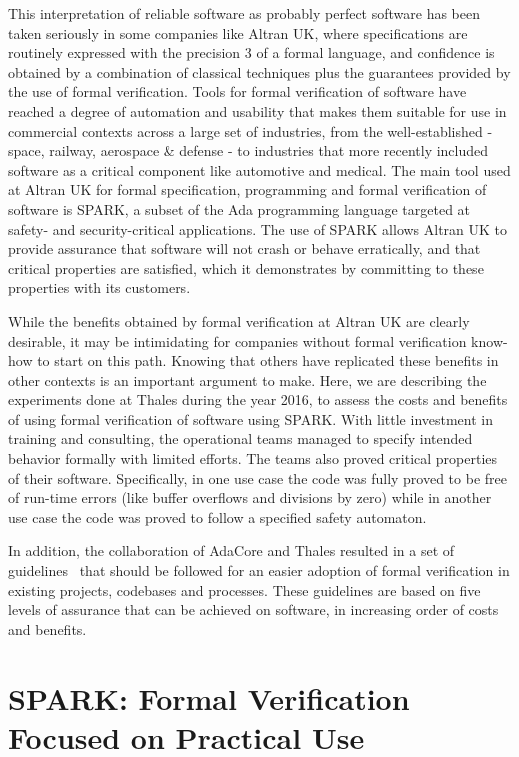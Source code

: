 \documentclass{llncs}
\begin{document}
This interpretation of reliable software as probably perfect software has been
taken seriously in some companies like Altran UK, where specifications are
routinely expressed with the precision 3 of a formal language, and confidence
is obtained by a combination of classical techniques plus the guarantees
provided by the use of formal verification. Tools for formal verification of
software have reached a degree of automation and usability that makes them
suitable for use in commercial contexts across a large set of industries, from
the well-established - space, railway, aerospace \& defense - to industries that
more recently included software as a critical component like automotive and
medical. The main tool used at Altran UK for formal specification, programming
and formal verification of software is SPARK, a subset of the Ada programming
language targeted at safety- and security-critical applications. The use of
SPARK allows Altran UK to provide assurance that software will not crash or
behave erratically, and that critical properties are satisfied, which it
demonstrates by committing to these properties with its customers.

While the benefits obtained by formal verification at Altran UK are clearly
desirable, it may be intimidating for companies without formal verification
know-how to start on this path. Knowing that others have replicated these
benefits in other contexts is an important argument to make.  Here, we are
describing the experiments done at Thales during the year 2016, to assess the
costs and benefits of using formal verification of software using SPARK. With
little investment in training and consulting, the operational teams managed to
specify intended behavior formally with limited efforts. The teams also proved
critical properties of their software. Specifically, in one use case the code
was fully proved to be free of run-time errors (like buffer overflows and
divisions by zero) while in another use case the code was proved to follow a
specified safety automaton.

In addition, the collaboration of AdaCore and Thales resulted in a set of
guidelines~\cite{AdaCoreThalesSPARK} that should be followed for an easier
adoption of formal verification in existing projects, codebases and
processes. These guidelines are based on five levels of assurance that can be
achieved on software, in increasing order of costs and benefits.

\section{SPARK: Formal Verification Focused on Practical Use}
\end{document}

